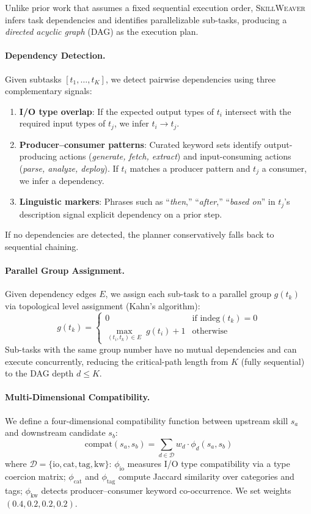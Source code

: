 \documentclass[11pt]{article}
\newcommand{\system}{\textsc{SkillWeaver}}
\begin{document}
Unlike prior work that assumes a fixed sequential execution order, \system{} infers task dependencies and identifies parallelizable sub-tasks, producing a \emph{directed acyclic graph} (DAG) as the execution plan.

\paragraph{Dependency Detection.}
Given subtasks $[t_1, \ldots, t_K]$, we detect pairwise dependencies using three complementary signals:
\begin{enumerate}[nosep,leftmargin=*]
  \item \textbf{I/O type overlap}: If the expected output types of $t_i$ intersect with the required input types of $t_j$, we infer $t_i \to t_j$.
  \item \textbf{Producer--consumer patterns}: Curated keyword sets identify output-producing actions (\emph{generate, fetch, extract}) and input-consuming actions (\emph{parse, analyze, deploy}). If $t_i$ matches a producer pattern and $t_j$ a consumer, we infer a dependency.
  \item \textbf{Linguistic markers}: Phrases such as ``\emph{then},'' ``\emph{after},'' ``\emph{based on}'' in $t_j$'s description signal explicit dependency on a prior step.
\end{enumerate}
If no dependencies are detected, the planner conservatively falls back to sequential chaining.

\paragraph{Parallel Group Assignment.}
Given dependency edges $E$, we assign each sub-task to a parallel group $g(t_k)$ via topological level assignment (Kahn's algorithm):
\begin{equation}
g(t_k) = \begin{cases} 0 & \text{if } \text{indeg}(t_k) = 0 \\ \max_{(t_i, t_k) \in E}\; g(t_i) + 1 & \text{otherwise} \end{cases}
\label{eq:parallel}
\end{equation}
Sub-tasks with the same group number have no mutual dependencies and can execute concurrently, reducing the critical-path length from $K$ (fully sequential) to the DAG depth $d \leq K$.

\paragraph{Multi-Dimensional Compatibility.}
We define a four-dimensional compatibility function between upstream skill $s_a$ and downstream candidate $s_b$:
\begin{equation}
\text{compat}(s_a, s_b) = \sum_{d \in \mathcal{D}} w_d \cdot \phi_d(s_a, s_b)
\label{eq:compat}
\end{equation}
where $\mathcal{D} = \{\text{io}, \text{cat}, \text{tag}, \text{kw}\}$: $\phi_\text{io}$ measures I/O type compatibility via a type coercion matrix; $\phi_\text{cat}$ and $\phi_\text{tag}$ compute Jaccard similarity over categories and tags; $\phi_\text{kw}$ detects producer--consumer keyword co-occurrence. We set weights $(0.4, 0.2, 0.2, 0.2)$.
\end{document}
